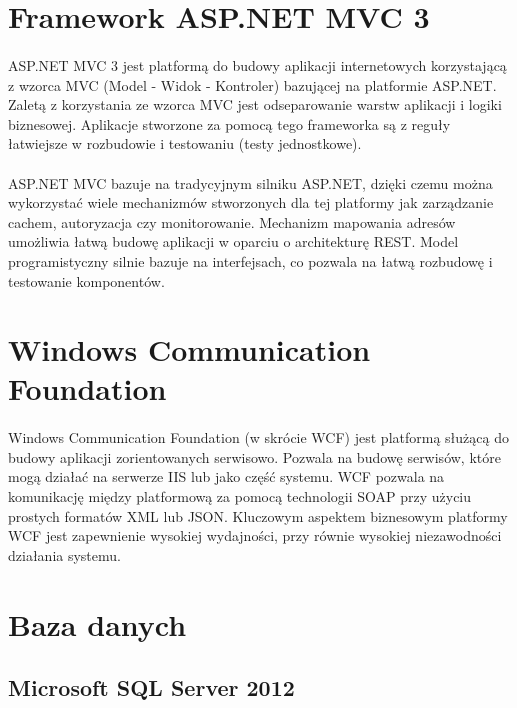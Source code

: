 \section{Framework ASP.NET MVC 3}

\paragraph{}
ASP.NET MVC 3 \cite{HackMVC3} jest platformą do budowy aplikacji internetowych korzystającą z wzorca MVC (Model - Widok - Kontroler) bazującej na platformie ASP.NET. Zaletą z korzystania ze wzorca MVC jest odseparowanie warstw aplikacji i logiki biznesowej. Aplikacje stworzone za pomocą tego frameworka są z reguły łatwiejsze w rozbudowie i testowaniu (testy jednostkowe).

\paragraph{}
ASP.NET MVC bazuje na tradycyjnym silniku ASP.NET, dzięki czemu można wykorzystać wiele mechanizmów stworzonych dla tej platformy jak zarządzanie cachem, autoryzacja czy monitorowanie. Mechanizm mapowania adresów umożliwia łatwą budowę aplikacji w oparciu o architekturę REST. Model programistyczny silnie bazuje na interfejsach, co pozwala na łatwą rozbudowę i testowanie komponentów.

\section{ Windows Communication Foundation }
\label{sec:wcf}
\paragraph{}
Windows Communication Foundation \cite{wcf1} \cite{wcf2} (w skrócie WCF) jest platformą służącą do budowy aplikacji zorientowanych serwisowo. Pozwala na budowę serwisów, które mogą działać na serwerze IIS lub jako część systemu. WCF pozwala na komunikację między platformową za pomocą technologii SOAP przy użyciu prostych formatów XML lub JSON. Kluczowym aspektem biznesowym platformy WCF jest zapewnienie wysokiej wydajności, przy równie wysokiej niezawodności działania systemu.

\section{Baza danych}

\subsection{Microsoft SQL Server 2012}
\label{sub:mssql}
